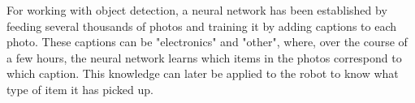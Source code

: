 For working with object detection, a neural network has been established by
feeding several thousands of photos and training it by adding captions to each
photo. These captions can be "electronics" and "other", where, over the course
of a few hours, the neural network learns which items in the photos correspond
to which caption. This knowledge can later be applied to the robot to know what
type of item it has picked up.

